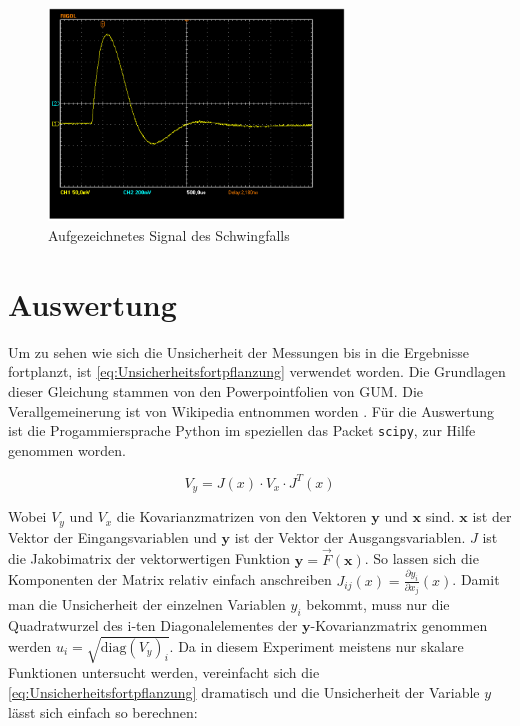 \documentclass[11pt,ngerman]{scrartcl}
\begin{document}
\begin{figure}[H]
	\begin{center}
		\includegraphics[width=0.7\textwidth]{Bild_versuch3_c}
	\end{center}
	\caption{Aufgezeichnetes Signal des Schwingfalls}
	\label{fig:schwingfall}
\end{figure}


\section{Auswertung}

\noindent Um zu sehen wie sich die Unsicherheit der Messungen bis in die Ergebnisse
fortplanzt, ist \autoref{eq:Unsicherheitsfortpflanzung} verwendet worden.
Die Grundlagen dieser Gleichung stammen von den Powerpointfolien von
GUM.\cite{WolfgangKessel2004} Die Verallgemeinerung ist von Wikipedia entnommen
worden \cite{2020Fehler}.
Für die Auswertung ist die Progammiersprache Python im speziellen das
Packet \verb#scipy#, zur Hilfe genommen worden.

\begin{equation}
	\label{eq:Unsicherheitsfortpflanzung}
	V_y = J(x) \cdot V_x \cdot J^{T}(x)
\end{equation}

\noindent Wobei $V_y$ und $V_x$ die Kovarianzmatrizen von den Vektoren $\bm{y}$ und $\bm{x}$ sind.
$\bm{x}$ ist der Vektor der Eingangsvariablen und $\bm{y}$ ist der Vektor der Ausgangsvariablen.
$J$ ist die Jakobimatrix der vektorwertigen Funktion $\bm{y} = \vec{F}(\bm{x})$.
So lassen sich die Komponenten der Matrix relativ einfach anschreiben $J_{ij}(x) = \frac{\partial{y_i}}{\partial{x_j}}(x)$.
Damit man die Unsicherheit der einzelnen Variablen $y_i$ bekommt, muss nur die Quadratwurzel des i-ten Diagonalelementes der
$\bm{y}$-Kovarianzmatrix genommen werden $u_i= \sqrt{\mathrm{diag}(V_y)_i}$.
Da in diesem Experiment meistens nur skalare Funktionen untersucht werden, vereinfacht
sich die \autoref{eq:Unsicherheitsfortpflanzung} dramatisch und die Unsicherheit
der Variable $y$ lässt sich einfach so berechnen:
\end{document}
